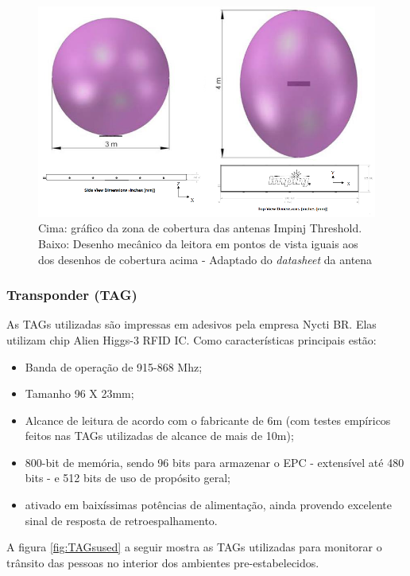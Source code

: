   \begin{figure}[H]
    \centering
    \includegraphics[width=0.6\linewidth]{figs/Metodologia/impinj_antenna_coverage.png}
    \caption{Cima: gráfico da zona de cobertura das antenas Impinj Threshold. Baixo: Desenho mecânico da leitora em pontos de vista iguais aos dos desenhos de cobertura acima - Adaptado do \textit{datasheet} da antena \cite{AntenaThresholdDatasheet}}
    \label{fig:AntenaThresholdCobertura}
\end{figure}

\subsubsection{Transponder (TAG)}

As TAGs utilizadas são impressas em adesivos pela empresa Nycti BR. Elas utilizam chip Alien Higgs-3 RFID IC. Como características principais estão:

\begin{itemize}
    \item Banda de operação de 915-868 Mhz;
    \item Tamanho 96 X 23mm;
    \item Alcance de leitura de acordo com o fabricante de 6m (com testes empíricos feitos nas TAGs utilizadas de alcance de mais de 10m);
    \item 800-bit de memória, sendo 96 bits para armazenar o EPC - extensível até 480 bits - e 512 bits de uso de propósito geral; \cite{AlienHiggs3}
    \item ativado em baixíssimas potências de alimentação, ainda provendo excelente sinal de resposta de retroespalhamento. \cite{AlienHiggs3}
\end{itemize}

A figura \ref{fig:TAGsused} a seguir mostra as TAGs utilizadas para monitorar o trânsito das pessoas no interior dos ambientes pre-estabelecidos.

